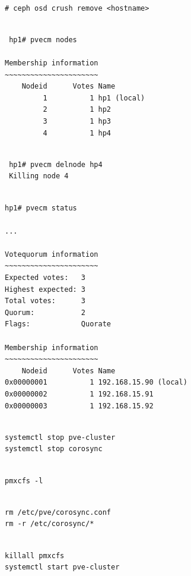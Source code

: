 \begin{lstlisting}

# ceph osd crush remove <hostname>

\end{lstlisting}

\begin{lstlisting}

 hp1# pvecm nodes

Membership information
~~~~~~~~~~~~~~~~~~~~~~
    Nodeid      Votes Name
         1          1 hp1 (local)
         2          1 hp2
         3          1 hp3
         4          1 hp4

\end{lstlisting}

\begin{lstlisting}

 hp1# pvecm delnode hp4
 Killing node 4

\end{lstlisting}

\begin{lstlisting}

hp1# pvecm status

...

Votequorum information
~~~~~~~~~~~~~~~~~~~~~~
Expected votes:   3
Highest expected: 3
Total votes:      3
Quorum:           2
Flags:            Quorate

Membership information
~~~~~~~~~~~~~~~~~~~~~~
    Nodeid      Votes Name
0x00000001          1 192.168.15.90 (local)
0x00000002          1 192.168.15.91
0x00000003          1 192.168.15.92

\end{lstlisting}

\begin{lstlisting}

systemctl stop pve-cluster
systemctl stop corosync

\end{lstlisting}

\begin{lstlisting}

pmxcfs -l

\end{lstlisting}

\begin{lstlisting}

rm /etc/pve/corosync.conf
rm -r /etc/corosync/*

\end{lstlisting}

\begin{lstlisting}

killall pmxcfs
systemctl start pve-cluster

\end{lstlisting}

